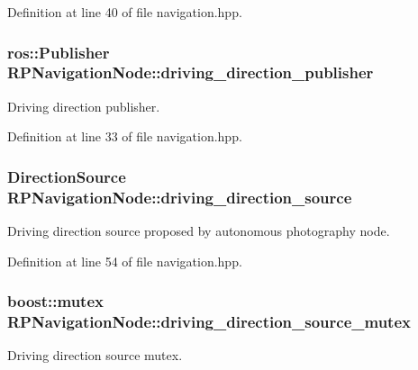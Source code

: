 \-Definition at line 40 of file navigation.\-hpp.

\hypertarget{class_r_p_navigation_node_a9bcecec9c0cb1889d8d686709d6096c6}{
\subsubsection[{driving\-\_\-direction\-\_\-publisher}]{\setlength{\rightskip}{0pt plus 5cm}ros\-::\-Publisher {\bf \-R\-P\-Navigation\-Node\-::driving\-\_\-direction\-\_\-publisher}}}\label{class_r_p_navigation_node_a9bcecec9c0cb1889d8d686709d6096c6}
\-Driving direction publisher. 

\-Definition at line 33 of file navigation.\-hpp.

\hypertarget{class_r_p_navigation_node_a5be6ceeeddc7cbee6d66ad54608a6973}{
\subsubsection[{driving\-\_\-direction\-\_\-source}]{\setlength{\rightskip}{0pt plus 5cm}\-Direction\-Source {\bf \-R\-P\-Navigation\-Node\-::driving\-\_\-direction\-\_\-source}}}\label{class_r_p_navigation_node_a5be6ceeeddc7cbee6d66ad54608a6973}
\-Driving direction source proposed by autonomous photography node. 

\-Definition at line 54 of file navigation.\-hpp.

\hypertarget{class_r_p_navigation_node_a8749c19ec480ac228295b86fa2562ef4}{
\subsubsection[{driving\-\_\-direction\-\_\-source\-\_\-mutex}]{\setlength{\rightskip}{0pt plus 5cm}boost\-::mutex {\bf \-R\-P\-Navigation\-Node\-::driving\-\_\-direction\-\_\-source\-\_\-mutex}}}\label{class_r_p_navigation_node_a8749c19ec480ac228295b86fa2562ef4}
\-Driving direction source mutex. 

